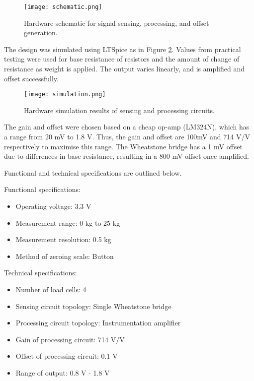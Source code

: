 \begin{figure}[!ht]
	\centering
	\texttt{[image: schematic.png]}
	\caption{Hardware schematic for signal sensing, processing, and offset generation.}
	\label{fig:schematic}
\end{figure}

The design was simulated using LTSpice as in Figure \ref{fig:simulation}. Values from practical testing were used for base resistance of resistors and the amount of change of resistance as weight is applied. The output varies linearly, and is amplified and offset successfully.

\begin{figure}[!ht]
	\centering
	\texttt{[image: simulation.png]}
	\caption{Hardware simulation results of sensing and processing circuits.}
	\label{fig:simulation}
\end{figure}

The gain and offset were chosen based on a cheap op-amp (LM324N), which has a range from 20 mV to 1.8 V. Thus, the gain and offset are 100mV and 714 V/V respectively to maximise this range. The Wheatstone bridge has a 1 mV offset due to differences in base resistance, resulting in a 800 mV offset once amplified.

Functional and technical specifications are outlined below.

Functional specifications:
\begin{itemize}
    \item Operating voltage:	3.3 V
    \item Measurement range:	0 kg to 25 kg
    \item Measurement resolution: 	0.5 kg
    \item Method of zeroing scale:	Button
\end{itemize}

Technical specifications:
\begin{itemize}
    \item Number of load cells:	4
    \item Sensing circuit topology:	Single Wheatstone bridge
    \item Processing circuit topology:	Instrumentation amplifier
    \item Gain of processing circuit:	714 V/V
    \item Offset of processing circuit:	0.1 V
    \item Range of output:               	0.8 V - 1.8 V
\end{itemize}